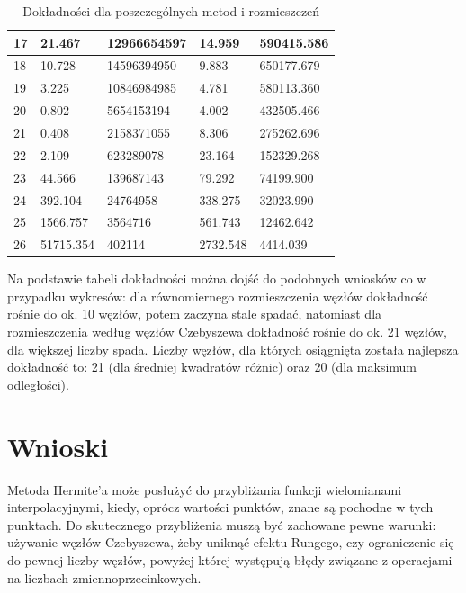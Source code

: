 \documentclass{article}
\begin{document}
\begin{table}[H]
\begin{tabular}{|l|ll|ll|}
    17& \multicolumn{1}{l|}{21.467}  &  12966654597 & \multicolumn{1}{l|}{14.959}  & 590415.586  \\ \hline
    18& \multicolumn{1}{l|}{10.728}  & 14596394950 & \multicolumn{1}{l|}{9.883}  &  650177.679 \\ \hline
    19& \multicolumn{1}{l|}{3.225}  &  10846984985 & \multicolumn{1}{l|}{4.781}  &  580113.360 \\ \hline
    20& \multicolumn{1}{l|}{0.802}  &  5654153194 & \multicolumn{1}{l|}{4.002}  & 432505.466  \\ \hline
    21& \multicolumn{1}{l|}{0.408}  & 2158371055  & \multicolumn{1}{l|}{8.306}  &  275262.696 \\ \hline
    22& \multicolumn{1}{l|}{2.109}  & 623289078  & \multicolumn{1}{l|}{23.164}  &  152329.268 \\ \hline
    23& \multicolumn{1}{l|}{44.566}  & 139687143  & \multicolumn{1}{l|}{79.292}  &  74199.900 \\ \hline
    24& \multicolumn{1}{l|}{392.104}  &  24764958 & \multicolumn{1}{l|}{338.275}  &  32023.990 \\ \hline
    25& \multicolumn{1}{l|}{1566.757}  &  3564716 & \multicolumn{1}{l|}{561.743}  &  12462.642 \\ \hline
    26& \multicolumn{1}{l|}{51715.354}  &  402114 & \multicolumn{1}{l|}{2732.548}  &  4414.039 \\ \hline
    \end{tabular}
    \caption{Dokładności dla poszczególnych metod i rozmieszczeń}
\end{table}

Na podstawie tabeli dokładności można dojść do podobnych wniosków co w przypadku wykresów: dla równomiernego rozmieszczenia
węzłów dokładność rośnie do ok. 10 węzłów, potem zaczyna stale spadać, natomiast dla rozmieszczenia według węzłów Czebyszewa
dokładność rośnie do ok. 21 węzłów, dla większej liczby spada. Liczby węzłów, dla których osiągnięta została najlepsza dokładność
to: 21 (dla średniej kwadratów różnic) oraz 20 (dla maksimum odległości).


\section{Wnioski}
Metoda Hermite'a może posłużyć do przybliżania funkcji wielomianami interpolacyjnymi, kiedy, oprócz wartości punktów, znane
są pochodne w tych punktach. Do skutecznego przybliżenia muszą być zachowane pewne warunki: używanie węzłów Czebyszewa, żeby
uniknąć efektu Rungego, czy ograniczenie się do pewnej liczby węzłów, powyżej której występują błędy związane z operacjami
na liczbach zmiennoprzecinkowych.
\end{document}
